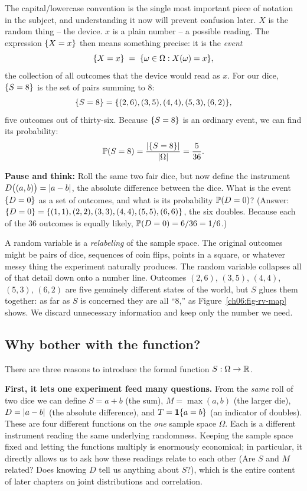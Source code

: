 The capital/lowercase convention is the single most
important piece of notation in the subject, and understanding it now will
prevent confusion later. $X$ is the random thing -- the device. $x$ is a
plain number -- a possible reading. The expression $\set{X = x}$ then means something
precise: it is the \emph{event}
\[
  \set{X = x} \;=\; \set{\omega \in \Omega : X(\omega) = x},
\]
the collection of all outcomes that the device would read as $x$. For our dice,
$\set{S = 8}$ is the set of pairs summing to $8$:
\[
  \set{S = 8} = \set{(2,6),(3,5),(4,4),(5,3),(6,2)},
\]
five outcomes out of thirty-six. Because $\set{S = 8}$ is an ordinary event, we can find its probability:
\[
  \P(S = 8) = \frac{\abs{\set{S=8}}}{\abs{\Omega}} = \frac{5}{36}.
\]

\begin{walkbox}
\textbf{Pause and think:} Roll the same two fair dice, but now define the instrument
$D\big((a,b)\big) = \abs{a - b}$, the absolute difference between the dice. What is the
event $\set{D = 0}$ as a set of outcomes, and what is its probability $\P(D = 0)$?
(Answer: $\set{D = 0} = \set{(1,1), (2,2), (3,3), (4,4), (5,5), (6,6)}$, the six doubles.
Because each of the $36$ outcomes is equally likely, $\P(D = 0) = 6/36 = 1/6$.)
\end{walkbox}

\begin{happeningbox}
A random variable is a \emph{relabeling} of the sample space. The original outcomes
might be pairs of dice, sequences of coin flips, points in a square, or whatever messy
thing the experiment naturally produces. The random variable collapses all of that
detail down onto a number line. Outcomes $(2,6)$, $(3,5)$, $(4,4)$, $(5,3)$, $(6,2)$
are five genuinely different states of the world, but $S$ glues them together: as far
as $S$ is concerned they are all ``$8$,'' as Figure~\ref{ch06:fig-rv-map} shows.
We discard unnecessary information and keep only the number we need.
\end{happeningbox}

\subsection{Why bother with the function?}

There are three reasons to introduce the formal function $S : \Omega \to \R$.

\textbf{First, it lets one experiment feed many questions.} From the \emph{same} roll
of two dice we can define $S = a+b$ (the sum), $M = \max(a,b)$ (the larger die),
$D = \abs{a-b}$ (the absolute difference), and $T = \ind\set{a = b}$ (an indicator of
doubles). These are four different functions on the \emph{one} sample space $\Omega$.
Each is a different instrument reading the same underlying randomness. Keeping the
sample space fixed and letting the functions multiply is enormously economical;
in particular, it directly allows us to ask how these readings relate to each other (Are $S$ and $M$
related? Does knowing $D$ tell us anything about $S$?), which is the entire content of
later chapters on joint distributions and correlation.

